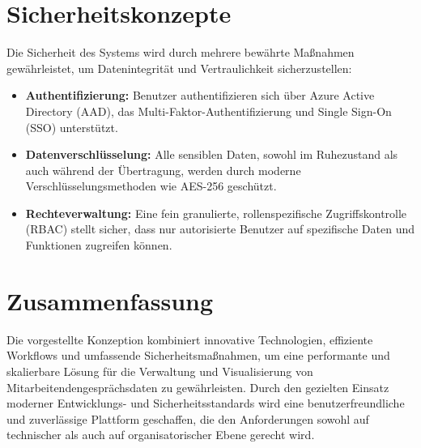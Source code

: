 \section{Sicherheitskonzepte}
Die Sicherheit des Systems wird durch mehrere bewährte Maßnahmen gewährleistet, um Datenintegrität und Vertraulichkeit sicherzustellen:
\begin{itemize}
    \item \textbf{Authentifizierung:} Benutzer authentifizieren sich über Azure Active Directory (AAD), das Multi-Faktor-Authentifizierung und Single Sign-On (SSO) unterstützt.
    \item \textbf{Datenverschlüsselung:} Alle sensiblen Daten, sowohl im Ruhezustand als auch während der Übertragung, werden durch moderne Verschlüsselungsmethoden wie AES-256 geschützt.
    \item \textbf{Rechteverwaltung:} Eine fein granulierte, rollenspezifische Zugriffskontrolle (RBAC) stellt sicher, dass nur autorisierte Benutzer auf spezifische Daten und Funktionen zugreifen können.
\end{itemize}

\section{Zusammenfassung}
Die vorgestellte Konzeption kombiniert innovative Technologien, effiziente Workflows und umfassende Sicherheitsmaßnahmen, um eine performante und skalierbare Lösung für die Verwaltung und Visualisierung von Mitarbeitendengesprächsdaten zu gewährleisten. Durch den gezielten Einsatz moderner Entwicklungs- und Sicherheitsstandards wird eine benutzerfreundliche und zuverlässige Plattform geschaffen, die den Anforderungen sowohl auf technischer als auch auf organisatorischer Ebene gerecht wird.

